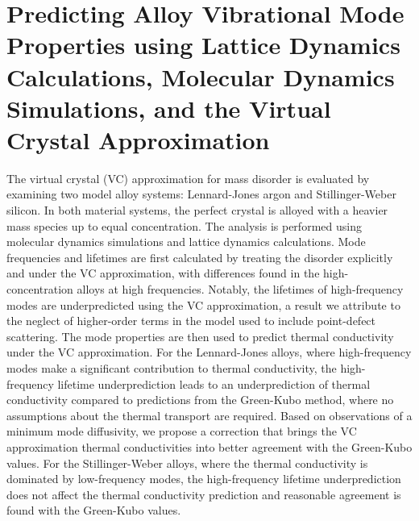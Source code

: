 \chapter{\label{chapter:vc}Predicting Alloy Vibrational Mode Properties 
using Lattice Dynamics Calculations, Molecular Dynamics Simulations, 
and the Virtual Crystal Approximation}

The virtual crystal (VC) approximation for mass disorder is evaluated by
examining two model alloy systems: Lennard-Jones argon and Stillinger-Weber
silicon. 
In both material systems, the perfect crystal is alloyed with a heavier mass
species up to equal concentration.
The analysis is performed using molecular dynamics simulations and lattice
dynamics calculations.
Mode frequencies and lifetimes are first calculated by treating the disorder
explicitly and under the VC approximation, with differences found in the
high-concentration alloys at high frequencies. 
Notably, the lifetimes of high-frequency modes are underpredicted using the
VC approximation, a result we attribute to the neglect of higher-order terms 
in the model used to include point-defect scattering.
The mode properties are then used to predict thermal conductivity under the
VC approximation.
For the Lennard-Jones alloys, where high-frequency modes make a significant
contribution to thermal conductivity, the high-frequency lifetime
underprediction leads to an underprediction of thermal conductivity compared
to predictions from the Green-Kubo method, where no assumptions about the
thermal transport are required.
Based on observations of a minimum mode diffusivity, we propose a correction
that brings the VC approximation thermal conductivities into better 
agreement with the Green-Kubo values. 
For the Stillinger-Weber alloys, where the thermal conductivity is dominated
by low-frequency modes, the high-frequency lifetime underprediction does not
affect the thermal conductivity prediction and reasonable agreement is found
with the Green-Kubo values. 

